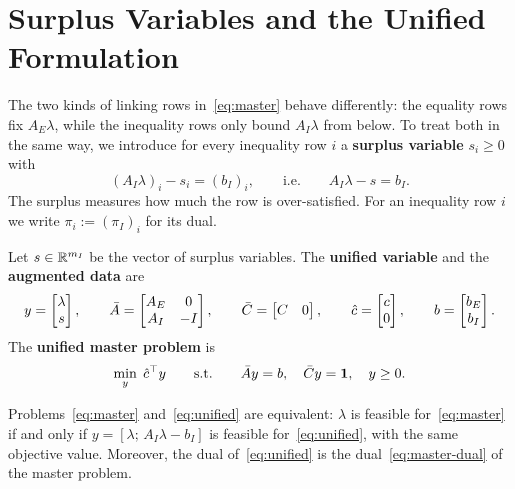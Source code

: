 \section{Surplus Variables and the Unified Formulation}
\label{sec:unified}

The two kinds of linking rows in~\eqref{eq:master} behave differently: the equality rows
fix $A_E\lambda$, while the inequality rows only bound $A_I\lambda$ from below. To treat both
in the same way, we introduce for every inequality row $i$ a \textbf{surplus variable}
$s_i\ge0$ with
\[
(A_I\lambda)_i - s_i = (b_I)_i, \qquad\text{i.e.}\qquad A_I\lambda - s = b_I .
\]
The surplus measures how much the row is over-satisfied. For an inequality row $i$ we write
$\pi_i := (\pi_I)_i$ for its dual.

\begin{definition} \label{def:unified}
Let $s\in\mathbb{R}^{m_I}$ be the vector of surplus variables. The \textbf{unified variable} and the
\textbf{augmented data} are
\[
y = \begin{bmatrix}\lambda\\ s\end{bmatrix}, \qquad
\bar{A} = \begin{bmatrix} A_E & 0\\ A_I & -I\end{bmatrix}, \qquad
\bar{C} = \begin{bmatrix} C & 0\end{bmatrix}, \qquad
\hat{c} = \begin{bmatrix} c\\ 0\end{bmatrix}, \qquad
b = \begin{bmatrix}b_E\\ b_I\end{bmatrix}.
\]
The \textbf{unified master problem} is
\begin{equation} \label{eq:unified}
\min_{y}\;\hat{c}^\top y \qquad\text{s.t.}\qquad \bar{A} y = b,\quad \bar{C} y = \mathbf{1},\quad y\ge0 .
\end{equation}
\end{definition}

\begin{lemma} \label{lem:unified}
Problems~\eqref{eq:master} and~\eqref{eq:unified} are equivalent: $\lambda$ is feasible
for~\eqref{eq:master} if and only if $y = [\lambda;\, A_I\lambda - b_I]$ is feasible
for~\eqref{eq:unified}, with the same objective value. Moreover, the dual
of~\eqref{eq:unified} is the dual~\eqref{eq:master-dual} of the master problem.
\end{lemma}

